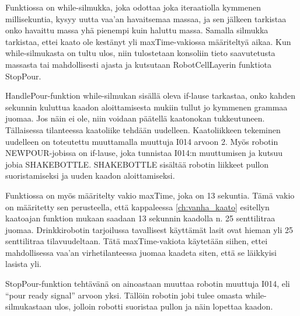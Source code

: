 Funktiossa on while-silmukka, joka odottaa joka iteraatiolla kymmenen millisekuntia, kysyy uutta vaa'an havaitsemaa massaa, ja sen jälkeen tarkistaa onko havaittu massa yhä pienempi kuin haluttu massa. Samalla silmukka tarkistaa, ettei kaato ole kestänyt yli maxTime-vakiossa määriteltyä aikaa. Kun while-silmukasta on tultu ulos, niin tulostetaan konsoliin tieto saavutetusta massasta tai mahdollisesti ajasta ja kutsutaan RobotCellLayerin funktiota StopPour.

HandlePour-funktion while-silmukan sisällä oleva if-lause tarkastaa, onko kahden sekunnin kuluttua kaadon aloittamisesta mukiin tullut jo kymmenen grammaa juomaa. Jos näin ei ole, niin voidaan päätellä kaatonokan tukkeutuneen. Tällaisessa tilanteessa kaatoliike tehdään uudelleen. Kaatoliikkeen tekeminen uudelleen on toteutettu muuttamalla muuttuja I014 arvoon 2. Myös robotin NEWPOUR-jobissa on if-lause, joka tunnistaa I014:n muuttumisen ja kutsuu jobia SHAKEBOTTLE. SHAKEBOTTLE sisältää robotin liikkeet pullon suoristamiseksi ja uuden kaadon aloittamiseksi.

Funktiossa on myös määritelty vakio maxTime, joka on 13 sekuntia. Tämä vakio on määritetty sen perusteella, että kappaleessa \ref{ch:vanha_kaato} esitellyn kaatoajan funktion mukaan saadaan 13 sekunnin kaadolla n. 25 senttilitraa juomaa. Drinkkirobotin tarjoilussa tavallisest käyttämät lasit ovat hieman yli 25 senttilitraa tilavuudeltaan. Tätä maxTime-vakiota käytetään siihen, ettei mahdollisessa vaa'an virhetilanteessa juomaa kaadeta siten, että se läikkyisi lasista yli.

StopPour-funktion tehtävänä on ainoastaan muuttaa robotin muuttuja I014, eli ``pour ready signal'' arvoon yksi. Tällöin robotin jobi tulee omasta while-silmukastaan ulos, jolloin robotti suoristaa pullon ja näin lopettaa kaadon.


%

